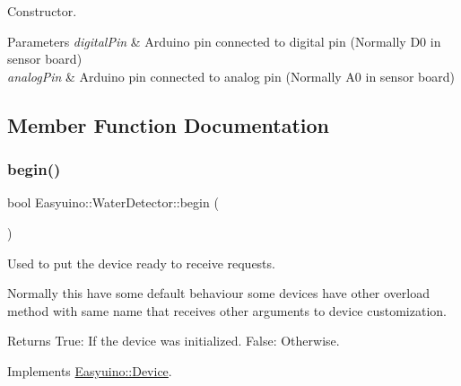 Constructor. 


\begin{DoxyParams}{Parameters}
{\em digital\+Pin} & Arduino pin connected to digital pin (Normally D0 in sensor board) \\
\hline
{\em analog\+Pin} & Arduino pin connected to analog pin (Normally A0 in sensor board) \\
\hline
\end{DoxyParams}


\subsection{Member Function Documentation}
\mbox{\label{class_easyuino_1_1_water_detector_af7a0ec32d6abcb8c1060f493525d5228}} 
\subsubsection{\texorpdfstring{begin()}{begin()}\hspace{0.1cm}{\footnotesize\ttfamily [1/2]}}
{\footnotesize\ttfamily bool Easyuino\+::\+Water\+Detector\+::begin (\begin{DoxyParamCaption}{ }\end{DoxyParamCaption})\hspace{0.3cm}{\ttfamily [virtual]}}



Used to put the device ready to receive requests. 

Normally this have some default behaviour some devices have other overload method with same name that receives other arguments to device customization. \begin{DoxyReturn}{Returns}
True\+: If the device was initialized. False\+: Otherwise. 
\end{DoxyReturn}


Implements \hyperlink{class_easyuino_1_1_device_a2e7bb2fec849719a9d9432b57cdb72ba}{Easyuino\+::\+Device}.

\mbox{\label{class_easyuino_1_1_water_detector_a06ac56298c56026691d7d6a9dbb63748}} 
